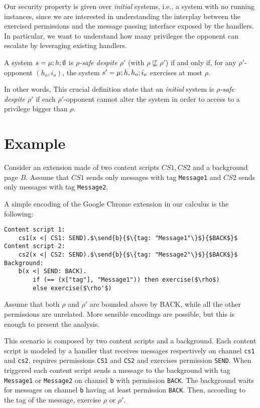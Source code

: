 Our security property is given over \emph{initial} systems, i.e., a system with no running instances, since we are interested in understanding the interplay between the exercised permissions and the message passing interface exposed by the handlers. In particular, we want to understand how many privileges the opponent can escalate by leveraging existing handlers.

\begin{definition}
\label{def:safety}
A system $s = \mu;h;\emptyset$ is \emph{$\rho$-safe despite $\rho'$} (with $\rho \not\sqsubseteq \rho'$) if and only if, for any $\rho'$-opponent $(h_o,i_o)$, the system $s' = \mu;h,h_o;i_o$ exercises at most $\rho$.
\end{definition}
In other words, This crucial definition state that an \emph{initial} system is \emph{$\rho$-safe despite $\rho'$} if each $\rho'$-opponent cannot alter the system in order to access to a privilege bigger than $\rho$.

\section{Example}
\label{sec:Example}
Consider an extension made of two content scripts $CS1,CS2$ and a background page $B$. Assume that $CS1$ sends only messages with tag \texttt{Message1} and $CS2$ sends only messages with tag \texttt{Message2}.

A simple encoding of the Google Chrome extension in our calculus is the following:
\begin{small}
\begin{lstlisting}[mathescape]
Content script 1:
	cs1(x <| CS1: SEND).$\send{b}{$\{tag: "Message1"\}$}{$BACK$}$ 
Content script 2:
	cs2(x <| CS2: SEND).$\send{b}{$\{tag: "Message2"\}$}{$BACK$}$ 
Background:
	b(x <| SEND: BACK).
		if (== (x["tag"], "Message1")) then exercise($\rho$)
		else exercise($\rho'$)
\end{lstlisting}
\end{small}
Assume that both $\rho$ and $\rho'$ are bounded above by BACK, while all the other permissions are unrelated. More sensible encodings are possible, but this is enough to present the analysis.

This scenario is composed by two content scripts and a background. Each content script is modeled by a handler that receives messages respectively on channel \texttt{cs1} and \texttt{cs2}, requires permissions \texttt{CS1} and \texttt{CS2} and exercises permission \texttt{SEND}. When triggered each content script sends a message to the background with tag \texttt{Message1} or \texttt{Message2} on channel \texttt{b} with permission \texttt{BACK}. The background waits for messages on channel \texttt{b} having at least permission \texttt{BACK}. Then, according to the tag of the message, exercise $\rho$ or $\rho'$.

